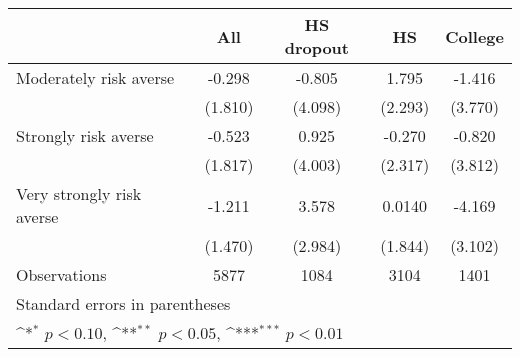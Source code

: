 {
\def\sym#1{\ifmmode^{#1}\else\(^{#1}\)\fi}
\begin{tabular}{l*{4}{c}}
\toprule
                    &\multicolumn{1}{c}{All}&\multicolumn{1}{c}{HS dropout}&\multicolumn{1}{c}{HS}&\multicolumn{1}{c}{College}\\
\midrule
Moderately risk averse&      -0.298         &      -0.805         &       1.795         &      -1.416         \\
                    &     (1.810)         &     (4.098)         &     (2.293)         &     (3.770)         \\
\addlinespace
Strongly risk averse&      -0.523         &       0.925         &      -0.270         &      -0.820         \\
                    &     (1.817)         &     (4.003)         &     (2.317)         &     (3.812)         \\
\addlinespace
Very strongly risk averse&      -1.211         &       3.578         &      0.0140         &      -4.169         \\
                    &     (1.470)         &     (2.984)         &     (1.844)         &     (3.102)         \\
\midrule
Observations        &        5877         &        1084         &        3104         &        1401         \\
\bottomrule
\multicolumn{5}{l}{\footnotesize Standard errors in parentheses}\\
\multicolumn{5}{l}{\footnotesize \sym{*} \(p<0.10\), \sym{**} \(p<0.05\), \sym{***} \(p<0.01\)}\\
\end{tabular}
}
